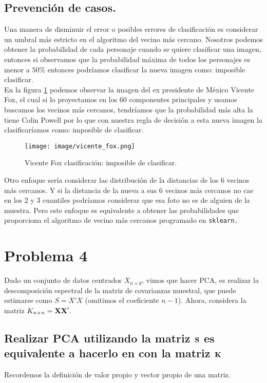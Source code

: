 \documentclass[paper=letter, fontsize=11pt]{scrartcl}
\numberwithin{equation}{section} %
\numberwithin{figure}{section} %
\numberwithin{table}{section} %
\begin{document}
\subsection{Prevención de casos.}
Una manera de disminuir el error o posibles errores de clasificación es considerar un umbral más estricto en el algoritmo del vecino más cercano. Nosotros podemos obtener la probabilidad de cada personaje cuando se quiere clasificar una imagen, entonces si observamos que la probabilidad máxima de todos los personajes es menor a $50\%$ entonces podríamos clasificar la nueva imagen como: imposible clasificar.\\
En la figura \ref{fig:vicente_fox} podemos observar la imagen del ex presidente de México Vicente Fox, el cual si lo proyectamos en los 60 componentes principales y usamos buscamos los vecinos más cercanos, tendríamos que la probabilidad más alta la tiene Colin Powell por lo que con nuestra regla de decisión a esta nueva imagen la clasificaríamos como: imposible de clasificar. 
\begin{figure}[H]
    \centering
    \texttt{[image: image/vicente\_fox.png]}
    \caption{Vicente Fox clasificación: imposible de clasificar.}
    \label{fig:vicente_fox}
\end{figure}
Otro enfoque sería considerar las distribución de la distancias de los 6 vecinos más cercanos. Y si la distancia de la nueva a sus 6 vecinos más cercanos no cae en los 2 y 3 cuantiles podríamos considerar que esa foto no es de alguien de la muestra. Pero este enfoque es equivalente a obtener las probabilidades que proporciona el algoritmo de vecino más cercanos programado en \texttt{sklearn.}

\section{Problema 4}
Dado un conjunto de datos centrados $X_{n\times d}$, vimos que hacer PCA, es realizar la descomposición espectral de la matriz de covarianzas muestral, que puede estimarse como $S=X'X$ (omitimos el coeficiente $n-1$). Ahora, considera la matriz $K_{n\times n}= \bf{XX}'.$

\subsection{Realizar PCA utilizando la matriz $\bf S$ es equivalente a hacerlo en con la matriz $\bf K$}
Recordemos la definición de valor propio y vector propio de una matriz.
\end{document}
